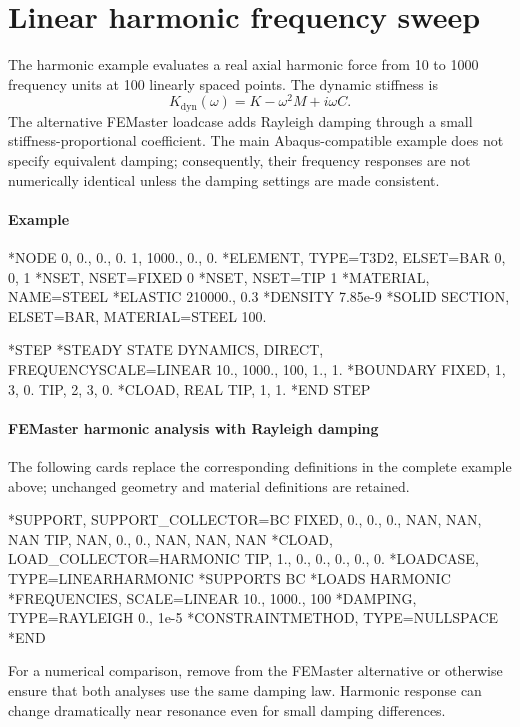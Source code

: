 \section{Linear harmonic frequency sweep}

The harmonic example evaluates a real axial harmonic force from 10 to 1000 frequency units at 100 linearly spaced points. The dynamic stiffness is
\[
K_\mathrm{dyn}(\omega)=K-\omega^2M+i\omega C.
\]
The alternative FEMaster loadcase adds Rayleigh damping through a small
stiffness-proportional coefficient. The main Abaqus-compatible example
does not specify equivalent damping; consequently, their frequency
responses are not numerically identical unless the damping settings
are made consistent.

\paragraph*{Example}

\begin{inputdeck}
*NODE
0, 0., 0., 0.
1, 1000., 0., 0.
*ELEMENT, TYPE=T3D2, ELSET=BAR
0, 0, 1
*NSET, NSET=FIXED
0
*NSET, NSET=TIP
1
*MATERIAL, NAME=STEEL
*ELASTIC
210000., 0.3
*DENSITY
7.85e-9
*SOLID SECTION, ELSET=BAR, MATERIAL=STEEL
100.

*STEP
*STEADY STATE DYNAMICS, DIRECT,
 FREQUENCYSCALE=LINEAR
10., 1000., 100, 1., 1.
*BOUNDARY
FIXED, 1, 3, 0.
TIP, 2, 3, 0.
*CLOAD, REAL
TIP, 1, 1.
*END STEP
\end{inputdeck}

\paragraph*{FEMaster harmonic analysis with Rayleigh damping}

The following cards replace the corresponding definitions in the
complete example above; unchanged geometry and material definitions
are retained.

\begin{inputdeck}
*SUPPORT, SUPPORT_COLLECTOR=BC
FIXED, 0., 0., 0., NAN, NAN, NAN
TIP, NAN, 0., 0., NAN, NAN, NAN
*CLOAD, LOAD_COLLECTOR=HARMONIC
TIP, 1., 0., 0., 0., 0., 0.
*LOADCASE, TYPE=LINEARHARMONIC
*SUPPORTS
BC
*LOADS
HARMONIC
*FREQUENCIES, SCALE=LINEAR
10., 1000., 100
*DAMPING, TYPE=RAYLEIGH
0., 1e-5
*CONSTRAINTMETHOD, TYPE=NULLSPACE
*END
\end{inputdeck}

For a numerical comparison, remove  from the FEMaster
alternative or otherwise ensure that both analyses use the same
damping law. Harmonic response can change dramatically near
resonance even for small damping differences.

